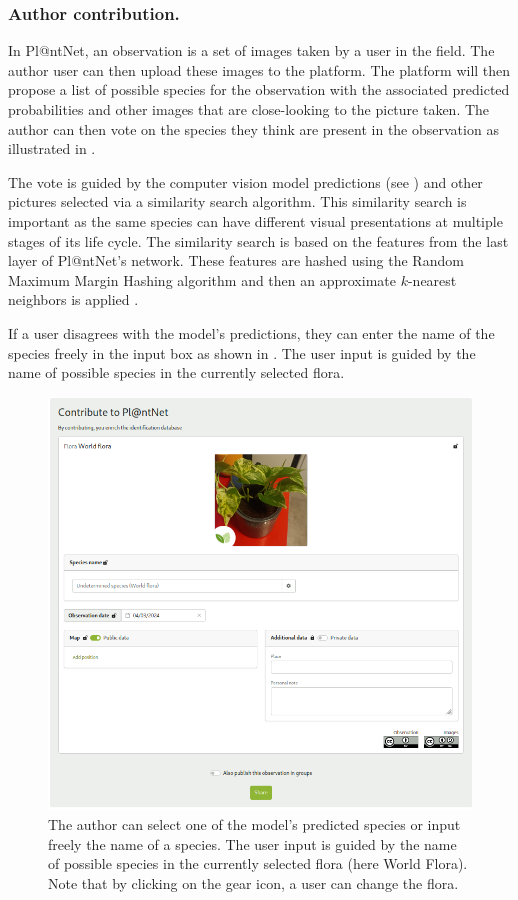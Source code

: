 \subsubsection{Author contribution.}

In Pl@ntNet, an observation is a set of images taken by a user in the field.
The author user can then upload these images to the platform.
The platform will then propose a list of possible species for the observation with the associated predicted probabilities and other images that are close-looking to the picture taken.
The author can then vote on the species they think are present in the observation as illustrated in .

The vote is guided by the computer vision model predictions (see ) and other pictures selected via a similarity search algorithm.
This similarity search is important as the same species can have different visual presentations at multiple stages of its life cycle.
The similarity search is based on the features from the last layer of Pl@ntNet's network.
These features are hashed using the Random Maximum Margin Hashing algorithm \citep{joly2011random} and then an approximate $k$-nearest neighbors is applied \citep{joly2008posteriori}.

If a user disagrees with the model's predictions, they can enter the name of the species freely in the input box as shown in .
The user input is guided by the name of possible species in the currently selected flora.

        \begin{figure}[tbh]
        \centering
        \includegraphics[width=.55\textwidth]{./images_plantnet/free_sharing_pothos.png}
        \caption{The author can select one of the model's predicted species or input freely the name of a species. The user input is guided by the name of possible species in the currently selected flora (here World Flora). Note that by clicking on the gear icon, a user can change the flora.}
        \label{fig:pothos_sharing}
        \end{figure}

